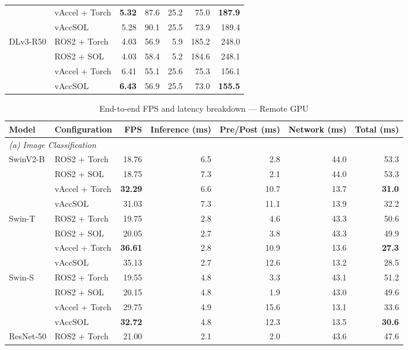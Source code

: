 \begin{table}[t]
\begin{tabular}{llrrrrr}
 & vAccel + Torch & \textbf{5.32} & 87.6 & 25.2 & 75.0 & \textbf{187.9} \\
 & vAccSOL & 5.28 & 90.1 & 25.5 & 73.9 & 189.4 \\
\cmidrule(lr){1-7}
\multirow{4}{*}{DLv3-R50} & ROS2 + Torch & 4.03 & 56.9 & 5.9 & 185.2 & 248.0 \\
 & ROS2 + SOL & 4.03 & 58.4 & 5.2 & 184.6 & 248.1 \\
 & vAccel + Torch & 6.41 & 55.1 & 25.6 & 75.3 & 156.1 \\
 & vAccSOL & \textbf{6.43} & 56.9 & 25.5 & 73.0 & \textbf{155.5} \\
\bottomrule
\end{tabular}
\end{table}

\begin{table}[t]
\centering
\caption{End-to-end FPS and latency breakdown --- Remote GPU}
\label{tab:e2e-remote-gpu}
\small
\begin{tabular}{llrrrrr}
\toprule
Model & Configuration & FPS & Inference (ms) & Pre/Post (ms) & Network (ms) & Total (ms) \\
\midrule
\multicolumn{7}{l}{\textit{(a) Image Classification}} \\
\midrule
\multirow{4}{*}{SwinV2-B} & ROS2 + Torch & 18.76 & 6.5 & 2.8 & 44.0 & 53.3 \\
 & ROS2 + SOL & 18.75 & 7.3 & 2.1 & 44.0 & 53.3 \\
 & vAccel + Torch & \textbf{32.29} & 6.6 & 10.7 & 13.7 & \textbf{31.0} \\
 & vAccSOL & 31.03 & 7.3 & 11.1 & 13.9 & 32.2 \\
\cmidrule(lr){1-7}
\multirow{4}{*}{Swin-T} & ROS2 + Torch & 19.75 & 2.8 & 4.6 & 43.3 & 50.6 \\
 & ROS2 + SOL & 20.05 & 2.7 & 3.8 & 43.3 & 49.9 \\
 & vAccel + Torch & \textbf{36.61} & 2.8 & 10.9 & 13.6 & \textbf{27.3} \\
 & vAccSOL & 35.13 & 2.7 & 12.6 & 13.2 & 28.5 \\
\cmidrule(lr){1-7}
\multirow{4}{*}{Swin-S} & ROS2 + Torch & 19.55 & 4.8 & 3.3 & 43.1 & 51.2 \\
 & ROS2 + SOL & 20.15 & 4.8 & 1.9 & 43.0 & 49.6 \\
 & vAccel + Torch & 29.75 & 4.9 & 15.6 & 13.1 & 33.6 \\
 & vAccSOL & \textbf{32.72} & 4.8 & 12.3 & 13.5 & \textbf{30.6} \\
\cmidrule(lr){1-7}
\multirow{4}{*}{ResNet-50} & ROS2 + Torch & 21.00 & 2.1 & 2.0 & 43.6 & 47.6 \\

\end{tabular}
\end{table}
